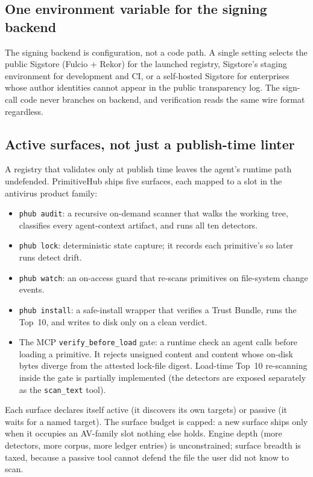 \subsection{One environment variable for the signing backend}

The signing backend is configuration, not a code path. A single setting
selects the public Sigstore (Fulcio + Rekor) for the launched registry,
Sigstore's staging environment for development and CI, or a self-hosted
Sigstore for enterprises whose author identities cannot appear in the
public transparency log. The sign-call code never branches on backend,
and verification reads the same wire format regardless.

\subsection{Active surfaces, not just a publish-time linter}

A registry that validates only at publish time leaves the agent's
runtime path undefended. PrimitiveHub ships five surfaces, each mapped
to a slot in the antivirus product family:

\begin{itemize}
  \item \texttt{phub audit}: a recursive on-demand scanner that walks
        the working tree, classifies every agent-context artifact, and
        runs all ten detectors.
  \item \texttt{phub lock}: deterministic state capture; it records each
        primitive's \contentdigest{} so later runs detect drift.
  \item \texttt{phub watch}: an on-access guard that re-scans primitives
        on file-system change events.
  \item \texttt{phub install}: a safe-install wrapper that verifies a
        Trust Bundle, runs the Top~10, and writes to disk only on a
        clean verdict.
  \item The MCP \texttt{verify\_before\_load} gate: a runtime check an
        agent calls before loading a primitive. It rejects unsigned
        content and content whose on-disk bytes diverge from the
        attested lock-file digest. Load-time Top~10 re-scanning inside
        the gate is partially implemented (the detectors are exposed
        separately as the \texttt{scan\_text} tool).
\end{itemize}

Each surface declares itself active (it discovers its own targets) or
passive (it waits for a named target). The surface budget is capped: a
new surface ships only when it occupies an AV-family slot nothing else
holds. Engine depth (more detectors, more corpus, more ledger entries)
is unconstrained; surface breadth is taxed, because a passive tool
cannot defend the file the user did not know to scan.

